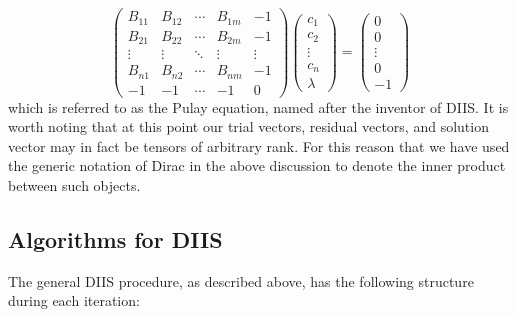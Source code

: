 \documentclass[11pt]{article}
\begin{document}
\begin{equation}
\begin{pmatrix}
B_{11} & B_{12} & \cdots & B_{1m} & -1 \\
B_{21} & B_{22} & \cdots & B_{2m} & -1 \\
\vdots  & \vdots  & \ddots & \vdots  & \vdots \\
B_{n1} & B_{n2} & \cdots & B_{nm} & -1 \\
-1 & -1 & \cdots & -1 & 0
\end{pmatrix}
\begin{pmatrix}
c_1\\
c_2\\
\vdots \\
c_n\\
\lambda
\end{pmatrix}
=
\begin{pmatrix}
0\\
0\\
\vdots\\
0\\
-1
\end{pmatrix}
\end{equation}
which is referred to as the Pulay equation, named after the inventor of DIIS.  It is worth noting that at this point our trial vectors, residual vectors, and solution vector may in fact be tensors of arbitrary rank. For this reason that we have used the generic notation of Dirac in the above discussion to denote the inner product between such objects.
\subsection{Algorithms for DIIS}
The general DIIS procedure, as described above, has the following structure during each iteration:
\end{document}
